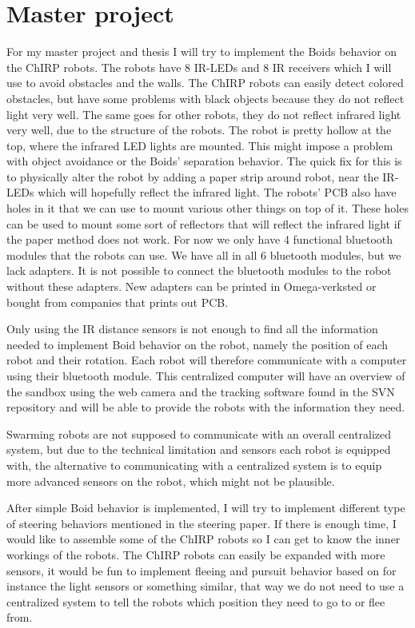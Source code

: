 \section{Master project}
For my master project and thesis I will try to implement the Boids behavior on the ChIRP robots. The robots have 8 IR-LEDs and 8 IR receivers which I will use to avoid obstacles and the walls. The ChIRP robots can easily detect colored obstacles, but have some problems with black objects because they do not reflect light very well. The same goes for other robots, they do not reflect infrared light very well, due to the structure of the robots. The robot is pretty hollow at the top, where the infrared LED lights are mounted. This might impose a problem with object avoidance or the Boids' separation behavior. The quick fix for this is to physically alter the robot by adding a paper strip around robot, near the IR-LEDs which will hopefully reflect the infrared light.
The robots' PCB also have holes in it that we can use to mount various other things on top of it. These holes can be used to mount some sort of reflectors that will reflect the infrared light if the paper method does not work.
For now we only have 4 functional bluetooth modules that the robots can use. We have all in all 6 bluetooth modules, but we lack adapters. It is not possible to connect the bluetooth modules to the robot without these adapters. New adapters can be printed in Omega-verksted or bought from companies that prints out PCB.

Only using the IR distance sensors is not enough to find all the information needed to implement Boid behavior on the robot, namely the position of each robot and their rotation.
Each robot will therefore communicate with a computer using their bluetooth module.
This centralized computer will have an overview of the sandbox using the web camera and the tracking software found in the SVN repository and will be able to provide the robots with the information they need.

Swarming robots are not supposed to communicate with an overall centralized system, but due to the technical limitation and sensors each robot is equipped with, the alternative to communicating with a centralized system is to equip more advanced sensors on the robot, which might not be plausible.

After simple Boid behavior is implemented, I will try to implement different type of steering behaviors mentioned in the steering paper. If there is enough time, I would like to assemble some of the ChIRP robots so I can get to know the inner workings of the robots. The ChIRP robots can easily be expanded with more sensors, it would be fun to implement fleeing and pursuit behavior based on for instance the light sensors or something similar, that way we do not need to use a centralized system to tell the robots which position they need to go to or flee from.

